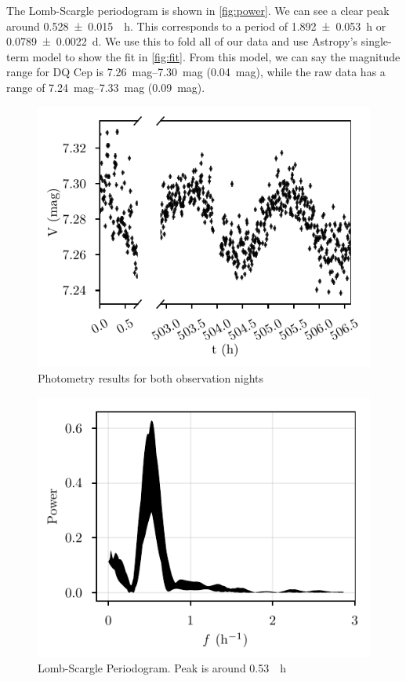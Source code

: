 \documentclass[%
aip,
jmp,
reprint,
floatfix,
nofootinbib
]{revtex4-1}
\begin{document}
	The Lomb-Scargle periodogram is shown in \autoref{fig:power}. We can see a clear peak around \SI{0.528\pm .015}{\per \hour}. This corresponds to a period of \SI{1.892\pm.053}{\hour} or \SI{0.0789\pm.0022}{\day}. We use this to fold all of our data and use Astropy's single-term model to show the fit in \autoref{fig:fit}. From this model, we can say the magnitude range for DQ Cep is \SIrange{7.26}{7.30}{mag} (\SI{.04}{mag}), while the raw data has a range of \SIrange{7.24}{7.33}{mag} (\SI{.09}{mag}).
	 \begin{figure}[t]
	 	\centering
	 	\includegraphics[width=\linewidth]{figs/rawmags.pdf}
	 	\caption{Photometry results for both observation nights}
	 	\label{fig:raw}
	 \end{figure}
	 \begin{figure}[t]
	 	\centering
	 	\includegraphics[width=\linewidth]{figs/power.pdf}
	 	\caption{Lomb-Scargle Periodogram. Peak is around \SI{0.53}{\per \hour}}
	 	\label{fig:power}
	 \end{figure}
\end{document}
